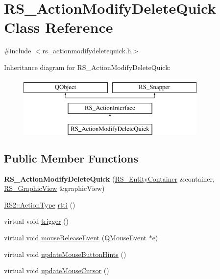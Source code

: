 \hypertarget{classRS__ActionModifyDeleteQuick}{\section{R\-S\-\_\-\-Action\-Modify\-Delete\-Quick Class Reference}
\label{classRS__ActionModifyDeleteQuick}
}


{\ttfamily \#include $<$rs\-\_\-actionmodifydeletequick.\-h$>$}

Inheritance diagram for R\-S\-\_\-\-Action\-Modify\-Delete\-Quick\-:\begin{figure}[H]
\begin{center}
\leavevmode
\includegraphics[height=3.000000cm]{classRS__ActionModifyDeleteQuick}
\end{center}
\end{figure}
\subsection*{Public Member Functions}
\begin{DoxyCompactItemize}
\item 
\hypertarget{classRS__ActionModifyDeleteQuick_a0e66d5b619aba48525f9f32cf7e08284}{{\bfseries R\-S\-\_\-\-Action\-Modify\-Delete\-Quick} (\hyperlink{classRS__EntityContainer}{R\-S\-\_\-\-Entity\-Container} \&container, \hyperlink{classRS__GraphicView}{R\-S\-\_\-\-Graphic\-View} \&graphic\-View)}\label{classRS__ActionModifyDeleteQuick_a0e66d5b619aba48525f9f32cf7e08284}

\item 
\hyperlink{classRS2_afe3523e0bc41fd637b892321cfc4b9d7}{R\-S2\-::\-Action\-Type} \hyperlink{classRS__ActionModifyDeleteQuick_a5df152f443a1346fd5c90b091ff1ac26}{rtti} ()
\item 
virtual void \hyperlink{classRS__ActionModifyDeleteQuick_a483f3ca2e020193b6314b5e43e03eb70}{trigger} ()
\item 
virtual void \hyperlink{classRS__ActionModifyDeleteQuick_a5cc5d0c5f75f118701e5e2b865041fac}{mouse\-Release\-Event} (Q\-Mouse\-Event $\ast$e)
\item 
virtual void \hyperlink{classRS__ActionModifyDeleteQuick_a2b794ce9d969126b031bccf56b8626ac}{update\-Mouse\-Button\-Hints} ()
\item 
virtual void \hyperlink{classRS__ActionModifyDeleteQuick_a1e9abfe39cfb5237d7f15578c851abf7}{update\-Mouse\-Cursor} ()
\end{DoxyCompactItemize}
